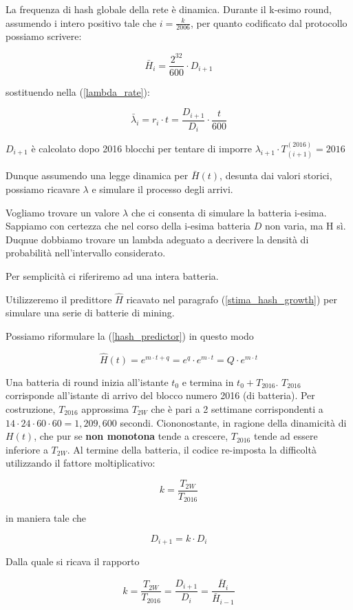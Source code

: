 \documentclass{article}
\begin{document}
La frequenza di hash globale della rete è dinamica.
Durante il k-esimo round, assumendo i intero positivo tale che $i = \frac{k}{2006}$, per quanto codificato dal protocollo possiamo scrivere:

$$
    \bar{H}_{i} = \frac{2^{32}}{600} \cdot D_{i+1}
$$

sostituendo nella (\ref{lambda_rate}):

$$
\bar{\lambda}_{i} = r_{i} \cdot t = \frac{D_{i+1}}{D_{i}} \cdot \frac{t}{600}
$$

$D_{i+1}$ è calcolato dopo 2016 blocchi per tentare di imporre $\lambda_{i+1} \cdot T_{(i+1)}^{(2016)}  = 2016$ 

Dunque assumendo una legge dinamica per $\bar{H}(t)$, desunta dai valori storici, possiamo ricavare $\lambda$ e simulare il processo degli arrivi.

Vogliamo trovare un valore $\lambda$ che ci consenta di simulare la batteria i-esima. Sappiamo con certezza che nel corso della i-esima batteria $D$ non varia, ma H sì. Duqnue dobbiamo trovare un lambda adeguato a decrivere la densità di probabilità nell'intervallo considerato.

Per semplicità ci riferiremo ad una intera batteria.

Utilizzeremo il predittore $\hat{H}$ ricavato nel paragrafo (\ref{stima_hash_growth}) per simulare una serie di batterie di mining.

Possiamo riformulare la (\ref{hash_predictor}) in questo modo

$$
	\hat{H}(t) = e^{m \cdot t + q} = e^{q} \cdot e^{m \cdot t} = Q \cdot e^{m \cdot t}
$$

Una batteria di round inizia all'istante $t_{0}$ e termina in $t_{0} + T_{2016}$. $T_{2016}$ corrisponde all'istante di arrivo del blocco numero 2016 (di batteria). Per costruzione, $T_{2016}$ approssima $T_{2W}$ che è pari a 2 settimane corrispondenti a $14 \cdot 24 \cdot 60 \cdot 60 = 1,209,600$ secondi. 
Ciononostante, in ragione della dinamicità di $H(t)$, che pur se \textbf{non monotona} tende a crescere, $T_{2016}$ tende ad essere inferiore a $T_{2W}$. Al termine della batteria, il codice re-imposta la difficoltà utilizzando il fattore moltiplicativo:

$$
    k = \frac{T_{2W}}{T_{2016}}
$$

in maniera tale che

$$
    D_{i+1} = k \cdot D_{i}
$$

Dalla quale si ricava il rapporto

$$
    k = \frac{T_{2W}}{T_{2016}} = \frac{D_{i+1}}{D_{i}} = \frac{\bar{H}_{i}}{\bar{H}_{i-1}}
$$ 
\end{document}
